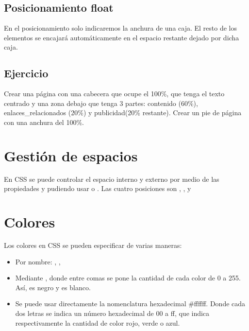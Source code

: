 \documentclass[letterpaper,10pt,spanish]{sphinxmanual}
\begin{document}
\subsection{Posicionamiento float}
\label{tema3:posicionamiento-float}
En el posicionamiento  solo indicaremos la anchura de una caja. El resto de los elementos se encajará automáticamente en el espacio restante dejado por dicha caja.


\subsection{Ejercicio}
\label{tema3:id4}
Crear una página con una cabecera que ocupe el 100\%, que tenga el texto centrado y una zona debajo que tenga 3 partes: contenido (60\%), enlaces\_relacionados (20\%) y publicidad(20\% restante). Crear un pie de página con una anchura del 100\%.


\section{Gestión de espacios}
\label{tema3:gestion-de-espacios}
En CSS se puede controlar el espacio interno y externo por medio de las propiedades  y  pudiendo usar  o . Las cuatro posiciones son , ,  y 


\section{Colores}
\label{tema3:colores}
Los colores en CSS se pueden especificar de varias maneras:
\begin{itemize}
\item {} 
Por nombre: , , 

\item {} 
Mediante , donde entre comas se pone la cantidad de cada color de 0 a 255. Así,  es negro y  es blanco.

\item {} 
Se puede usar directamente la nomenclatura hexadecimal \#ffffff. Donde cada dos letras se indica un número hexadecimal de 00 a ff, que indica respectivamente la cantidad de color rojo, verde o azul.

\end{itemize}
\end{document}
